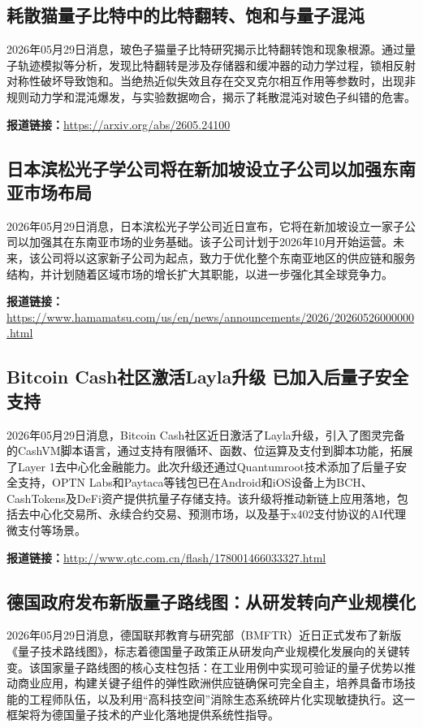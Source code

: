 \documentclass[12pt,a4paper]{ctexart}
\begin{document}
\subsection{ 耗散猫量子比特中的比特翻转、饱和与量子混沌 }

2026年05月29日消息，玻色子猫量子比特研究揭示比特翻转饱和现象根源。通过量子轨迹模拟等分析，发现比特翻转是涉及存储器和缓冲器的动力学过程，锁相反射对称性破坏导致饱和。当绝热近似失效且存在交叉克尔相互作用等参数时，出现非规则动力学和混沌爆发，与实验数据吻合，揭示了耗散混沌对玻色子纠错的危害。

\noindent\textbf{报道链接：}\url{https://arxiv.org/abs/2605.24100}

\subsection{ 日本滨松光子学公司将在新加坡设立子公司以加强东南亚市场布局 }

2026年05月29日消息，日本滨松光子学公司近日宣布，它将在新加坡设立一家子公司以加强其在东南亚市场的业务基础。该子公司计划于2026年10月开始运营。未来，该公司将以这家新子公司为起点，致力于优化整个东南亚地区的供应链和服务结构，并计划随着区域市场的增长扩大其职能，以进一步强化其全球竞争力。

\noindent\textbf{报道链接：}\url{https://www.hamamatsu.com/us/en/news/announcements/2026/20260526000000.html}

\subsection{ Bitcoin Cash社区激活Layla升级 已加入后量子安全支持 }

2026年05月29日消息，Bitcoin Cash社区近日激活了Layla升级，引入了图灵完备的CashVM脚本语言，通过支持有限循环、函数、位运算及支付到脚本功能，拓展了Layer 1去中心化金融能力。此次升级还通过Quantumroot技术添加了后量子安全支持，OPTN Labs和Paytaca等钱包已在Android和iOS设备上为BCH、CashTokens及DeFi资产提供抗量子存储支持。该升级将推动新链上应用落地，包括去中心化交易所、永续合约交易、预测市场，以及基于x402支付协议的AI代理微支付等场景。

\noindent\textbf{报道链接：}\url{http://www.qtc.com.cn/flash/178001466033327.html}

\subsection{ 德国政府发布新版量子路线图：从研发转向产业规模化 }

2026年05月29日消息，德国联邦教育与研究部（BMFTR）近日正式发布了新版《量子技术路线图》，标志着德国量子政策正从研发向产业规模化发展向的关键转变。该国家量子路线图的核心支柱包括：在工业用例中实现可验证的量子优势以推动商业应用，构建关键子组件的弹性欧洲供应链确保可完全自主，培养具备市场技能的工程师队伍，以及利用“高科技空间”消除生态系统碎片化实现敏捷执行。这一框架将为德国量子技术的产业化落地提供系统性指导。
\end{document}
